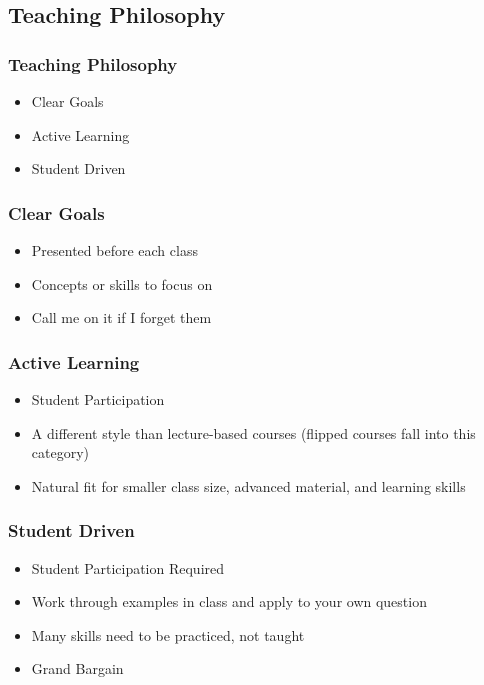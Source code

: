 \documentclass{beamer}
\begin{document}
\subsection{Teaching Philosophy}
\begin{frame}
\frametitle{Teaching Philosophy}
\begin{itemize}
	\item Clear Goals
	\item Active Learning
	\item Student Driven
\end{itemize}

\end{frame}
\begin{frame}
\frametitle{Clear Goals}
\begin{itemize}
	\item Presented before each class
	\item Concepts or skills to focus on
	\item Call me on it if I forget them
\end{itemize}
%
\end{frame}
\begin{frame}
\frametitle{Active Learning}
\begin{itemize}
	\item Student Participation
	\item A different style than lecture-based courses (flipped courses fall into this category)
	\item Natural fit for smaller class size, advanced material, and learning skills
\end{itemize}

%
\end{frame}
\begin{frame}
\frametitle{Student Driven}
\begin{itemize}
	\item Student Participation Required
	\item Work through examples in class and apply to your own question
	\item Many skills need to be practiced, not taught
	\item Grand Bargain
\end{itemize}

\end{frame}
\end{document}
